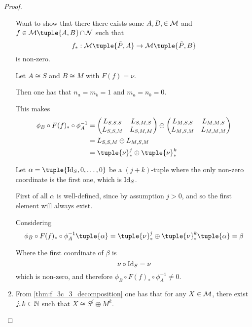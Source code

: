 \begin{proof}
\begin{enumerate}
{            Want to show that there there exists some \( A, B, \in {\mathcal{M}} \) and \( f \in \Mc\tuple{A, B} \intersect \Nc \) such that
            \[
                f_*: \Mc\tuple{\tilde{P}, A} \to \Mc\tuple{\tilde{P}, B}
            \]
            is non-zero.

            Let \( A \cong S \) and \( B \cong M \) with \( F(f) = \nu \).

            Then one has that \( n_a = m_b = 1 \) and \( m_a = n_b = 0 \).

            This makes
            \begin{align*}
                \phi_B \circ F(f)_* \circ \phi_A^{-1} &=
                \begin{pmatrix}
                    L_{S, S, S} & L_{S, M, S} \\
                    L_{S, S, M } & L_{S, M, M}
                \end{pmatrix}
                \oplus
                \begin{pmatrix}
                    L_{M, S, S} & L_{M, M, S} \\
                    L_{M, S, M} & L_{M, M, M}
                \end{pmatrix} \\
                &= L_{S, S, M} \oplus L_{M, S, M} \\
                &= \tuple{\nu}_*^j \oplus \tuple{\nu}_*^k
            \end{align*}

            Let \( \alpha = \tuple{\Id_S, 0, \dots, 0} \) be a \( (j + k) \)-tuple where the only non-zero coordinate is the first one, which is \( \operatorname{Id}_S \).

            First of all \( \alpha \) is well-defined, since by assumption \( j > 0 \), and so the first element will always exist.

            Considering
            \[
                \phi_B \circ F(f)_* \circ \phi_A^{-1} \tuple{\alpha} =
                \tuple{\nu}_*^j \oplus \tuple{\nu}_*^k \tuple{\alpha} =
                \beta
            \]

            Where the first coordinate of \( \beta \) is
            \[
                \nu \circ \operatorname{Id}_S = \nu
            \]
            which is non-zero, and therefore \( \phi_B \circ F(f)_* \circ \phi_A^{-1} \neq 0 \).
        }
        \item {
            From \autoref{thm:f_3c_3_decomposition} one has that for any \( X \in {\mathcal{M}} \), there exist \( j, k \in {\mathbb{N}} \) such that \( X \cong S^j \oplus M^k \).

}
\end{enumerate}
\end{proof}
